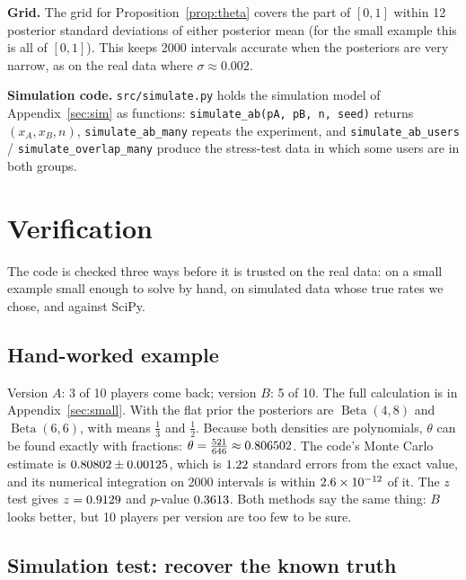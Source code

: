 \documentclass[11pt]{article}
\theoremstyle{definition}
\theoremstyle{remark}
\newcommand{\Betad}{\operatorname{Beta}}
\begin{document}
\textbf{Grid.} The grid for Proposition~\ref{prop:theta} covers the part of $[0,1]$ within 12 posterior standard
deviations of either posterior mean (for the small example this is all of $[0,1]$). This keeps 2000 intervals
accurate when the posteriors are very narrow, as on the real data where $\sigma\approx0.002$.

\sloppy
\textbf{Simulation code.} \texttt{src/simulate.py} holds the simulation model of Appendix~\ref{sec:sim} as functions:
\texttt{simulate\_ab(pA, pB, n, seed)} returns $(x_A,x_B,n)$, \texttt{simulate\_ab\_many} repeats the experiment,
and \texttt{simulate\_ab\_users} / \texttt{simulate\_overlap\_many} produce the stress-test data in which some
users are in both groups.\par\fussy

\section{Verification}\label{sec:verification}

The code is checked three ways before it is trusted on the real data: on a small example small enough to solve by
hand, on simulated data whose true rates we chose, and against SciPy.

\subsection{Hand-worked example}\label{sec:small-summary}
Version $A$: 3 of 10 players come back; version $B$: 5 of 10. The full calculation is in
Appendix~\ref{sec:small}. With the flat prior the posteriors are $\Betad(4,8)$ and $\Betad(6,6)$, with means
$\frac13$ and $\frac12$. Because both densities are polynomials, $\theta$ can be found exactly with fractions:
$\theta=\tfrac{521}{646}\approx0.806502$. The code's Monte Carlo estimate is $0.80802\pm0.00125$, which is
$1.22$ standard errors from the exact value, and its numerical integration on 2000 intervals is within
$2.6\times10^{-12}$ of it. The $z$ test gives $z=0.9129$ and $p$-value $0.3613$. Both methods say the same thing: $B$ looks
better, but 10 players per version are too few to be sure.

\subsection{Simulation test: recover the known truth}\label{sec:it3-sim}
\end{document}
